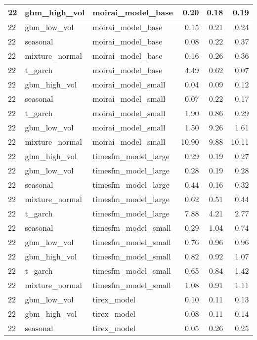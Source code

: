 {\begin{tabular}{lllrrr}
\midrule
22 & gbm\_high\_vol & moirai\_model\_base & 0.20 & 0.18 & 0.19 \\
\midrule
22 & gbm\_low\_vol & moirai\_model\_base & 0.15 & 0.21 & 0.24 \\
\midrule
22 & seasonal & moirai\_model\_base & 0.08 & 0.22 & 0.37 \\
\midrule
22 & mixture\_normal & moirai\_model\_base & 0.16 & 0.26 & 0.36 \\
\midrule
22 & t\_garch & moirai\_model\_base & 4.49 & 0.62 & 0.07 \\
\midrule
22 & gbm\_high\_vol & moirai\_model\_small & 0.04 & 0.09 & 0.12 \\
\midrule
22 & seasonal & moirai\_model\_small & 0.07 & 0.22 & 0.17 \\
\midrule
22 & t\_garch & moirai\_model\_small & 1.90 & 0.86 & 0.29 \\
\midrule
22 & gbm\_low\_vol & moirai\_model\_small & 1.50 & 9.26 & 1.61 \\
\midrule
22 & mixture\_normal & moirai\_model\_small & 10.90 & 9.88 & 10.11 \\
\midrule
22 & gbm\_high\_vol & timesfm\_model\_large & 0.29 & 0.19 & 0.27 \\
\midrule
22 & gbm\_low\_vol & timesfm\_model\_large & 0.28 & 0.19 & 0.28 \\
\midrule
22 & seasonal & timesfm\_model\_large & 0.44 & 0.16 & 0.32 \\
\midrule
22 & mixture\_normal & timesfm\_model\_large & 0.62 & 0.51 & 0.44 \\
\midrule
22 & t\_garch & timesfm\_model\_large & 7.88 & 4.21 & 2.77 \\
\midrule
22 & seasonal & timesfm\_model\_small & 0.29 & 1.04 & 0.74 \\
\midrule
22 & gbm\_low\_vol & timesfm\_model\_small & 0.76 & 0.96 & 0.96 \\
\midrule
22 & gbm\_high\_vol & timesfm\_model\_small & 0.82 & 0.92 & 1.07 \\
\midrule
22 & t\_garch & timesfm\_model\_small & 0.65 & 0.84 & 1.42 \\
\midrule
22 & mixture\_normal & timesfm\_model\_small & 1.08 & 0.91 & 1.11 \\
\midrule
22 & gbm\_low\_vol & tirex\_model & 0.10 & 0.11 & 0.13 \\
\midrule
22 & gbm\_high\_vol & tirex\_model & 0.08 & 0.11 & 0.14 \\
\midrule
22 & seasonal & tirex\_model & 0.05 & 0.26 & 0.25 \\
\midrule

\end{tabular}}
